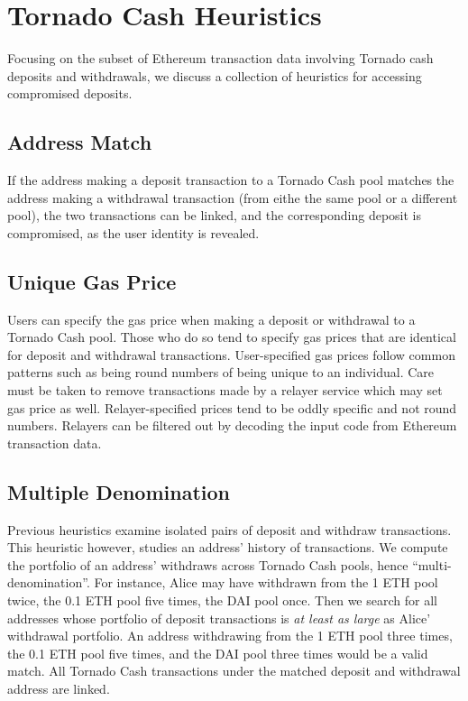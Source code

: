 \documentclass[11pt,a4paper]{article}
\begin{document}
\section{Tornado Cash Heuristics}
\label{sec:tornado}

Focusing on the subset of Ethereum transaction data involving Tornado cash deposits and withdrawals, we discuss a collection of heuristics for accessing compromised deposits.

\subsection{Address Match}

If the address making a deposit transaction to a Tornado Cash pool matches the address making a withdrawal transaction (from eithe the same pool or a different pool), the two transactions can be linked, and the corresponding deposit is compromised, as the user identity is revealed.

\subsection{Unique Gas Price}

Users can specify the gas price when making a deposit or withdrawal to a Tornado Cash pool. Those who do so tend to specify gas prices that are identical for deposit and withdrawal transactions. User-specified gas prices follow common patterns such as being round numbers of being unique to an individual. Care must be taken to remove transactions made by a relayer service which may set gas price as well. Relayer-specified prices tend to be oddly specific and not round numbers. Relayers can be filtered out by decoding the input code from Ethereum transaction data.

\subsection{Multiple Denomination}

Previous heuristics examine isolated pairs of deposit and withdraw transactions. This heuristic however, studies an address' history of transactions. We compute the portfolio of an address' withdraws across Tornado Cash pools, hence ``multi-denomination''. For instance, Alice may have withdrawn from the 1 ETH pool twice, the 0.1 ETH pool five times, the DAI pool once. Then we search for all addresses whose portfolio of deposit transactions is \textit{at least as large} as Alice' withdrawal portfolio. An address withdrawing from the 1 ETH pool three times, the 0.1 ETH pool five times, and the DAI pool three times would be a valid match. All Tornado Cash transactions under the matched deposit and withdrawal address are linked.
\end{document}
